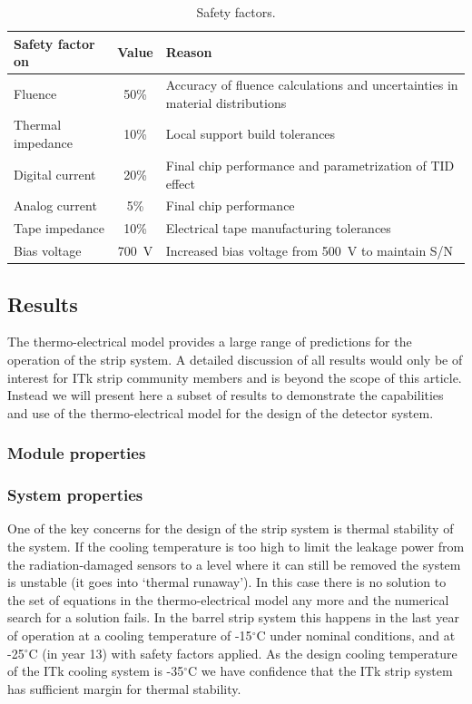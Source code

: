 \begin{table}[htb]
\caption{Safety factors.}
\label{tab:safetyfactors}
\centering
\begin{tabular}{lcl}
Safety factor on & Value & Reason \\
\hline
Fluence  & 50\% & Accuracy of fluence calculations and uncertainties in material distributions\\
Thermal impedance & 10\% & Local support build tolerances\\
Digital current & 20\% & Final chip performance and parametrization of TID effect\\
Analog current & 5\% & Final chip performance\\
Tape impedance & 10\% & Electrical tape manufacturing tolerances\\
Bias voltage & 700~V & Increased bias voltage from 500~V to maintain S/N\\
\end{tabular}
\end{table}

\subsection{Results}
The thermo-electrical model provides a large range of predictions for the operation of the strip system. A detailed discussion of all results would only be of interest for ITk strip community members and is beyond the scope of this article. Instead we will present here a subset of results to demonstrate the capabilities and use of the thermo-electrical model for the design of the detector system.
\subsubsection{Module properties}
\subsubsection{System properties}
One of the key concerns for the design of the strip system is thermal stability of the system. If the cooling temperature is too high to limit the leakage power from the radiation-damaged sensors to a level where it can still be removed the system is unstable (it goes into `thermal runaway'). In this case there is no solution to the set of equations in the thermo-electrical model any more and the numerical search for a solution fails. In the barrel strip system this happens in the last year of operation at a cooling temperature of -15$^\circ$C under nominal conditions, and at -25$^\circ$C (in year 13) with safety factors applied. As the design cooling temperature of the ITk cooling system is -35$^\circ$C we have confidence that the ITk strip system has sufficient margin for thermal stability.  

